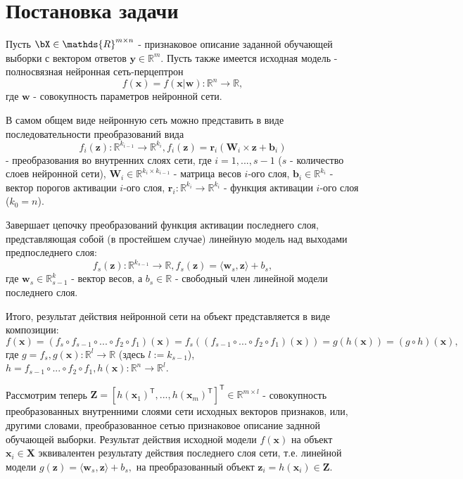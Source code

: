 \documentclass[12pt,twoside]{article}
\begin{document}
\section{Постановка задачи}
Пусть $\bX \in \mathds{R}^{m \times n}$ - признаковое описание заданной обучающей выборки с вектором ответов $\mathbf{y} \in \mathds{R}^m$. Пусть также имеется исходная модель - полносвязная нейронная сеть-перцептрон $$f(\mathbf{x}) = f(\mathbf{x}|\mathbf{w}):\mathds{R}^n \rightarrow \mathds{R},$$ где $\mathbf{w}$ - совокупность параметров нейронной сети. \par
В самом общем виде нейронную сеть можно представить в виде последовательности преобразований вида $$f_i(\mathbf{z}):\mathds{R}^{k_{i-1}} \rightarrow \mathds{R}^{k_i}, f_i(\mathbf{z}) = \mathbf{r}_i(\mathbf{W}_i\times\mathbf{z} + \mathbf{b}_i)$$ - преобразования во внутренних слоях сети, где $i = 1, ..., s-1$ ($s$ - количество слоев нейронной сети), $\mathbf{W}_i \in \mathds{R}^{k_i \times k_{i-1}}$ - матрица весов $i$-ого слоя, $\mathbf{b}_i \in \mathds{R}^{k_i}$ - вектор порогов активации $i$-ого слоя, $\mathbf{r}_i: \mathds{R}^{k_i} \rightarrow \mathds{R}^{k_i}$ - функция активации $i$-ого слоя ($k_0 = n$). \par Завершает цепочку преобразований функция активации последнего слоя, представляющая собой (в простейшем случае) линейную модель над выходами предпоследнего слоя:
$$f_s(\mathbf{z}):\mathds{R}^{k_{s-1}} \rightarrow \mathds{R}, f_s(\mathbf{z}) = \langle\mathbf{w}_s,\mathbf{z}\rangle + b_s,$$ где  $\mathbf{w}_s \in \mathds{R}^k_{s-1}$ - вектор весов, а $b_s \in \mathds{R}$ - свободный член линейной модели последнего слоя. \par
Итого, результат действия нейронной сети на объект представляется в виде композиции:$$f(\mathbf{x}) = (f_s \circ f_{s-1} \circ ... \circ f_2 \circ f_1)(\mathbf{x}) = f_s((f_{s-1} \circ ... \circ f_2 \circ f_1)(\mathbf{x})) = g(h(\mathbf{x})) = (g \circ h)(\mathbf{x}),$$
где $g = f_s, g(\mathbf{x}):\mathds{R}^{l} \rightarrow \mathds{R}$ (здесь $l := k_{s-1}$), $h = f_{s-1} \circ ... \circ f_2 \circ f_1, h(\mathbf{x}):\mathds{R}^n \rightarrow \mathds{R}^l.$ 
\newline
\par
Рассмотрим теперь $\mathbf{Z}=[h(\mathbf{x}_1)^{\mathsf{T}},...,h(\mathbf{x}_m)^{\mathsf{T}}]^{\mathsf{T}} \in \mathds{R}^{m \times l}$ - совокупность преобразованных внутренними слоями сети исходных векторов признаков, или, другими словами, преобразованное сетью признаковое описание заднной обучающей выборки. Результат действия исходной модели $f(\mathbf{x})$ на объект $\mathbf{x}_i \in \mathbf{X}$ эквивалентен результату действия последнего слоя сети, т.е. линейной модели $g(\mathbf{z}) =  \langle\mathbf{w}_s,\mathbf{z}\rangle + b_s,$ на преобразованный объект $\mathbf{z}_i = h(\mathbf{x}_i) \in \mathbf{Z}$.\par
\end{document}
